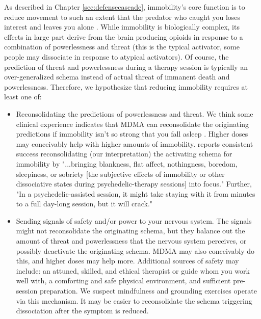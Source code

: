 \documentclass[12pt,letterpaper]{book}
\begin{document}
As described in Chapter \ref{sec:defensecascade}, immobility's core function is to reduce movement to such an extent that the predator who caught you loses interest and leaves you alone \cite{kozlowskaDefenseCascade}. While immobility is biologically complex, its effects in large part derive from the brain producing opioids in response to a combination of powerlessness and threat (this is the typical activator, some people may dissociate in response to atypical activators). Of course, the prediction of threat and powerlessness during a therapy session is typically an over-generalized schema instead of actual threat of immanent death and powerlessness. Therefore, we hypothesize that reducing immobility requires at least one of:
\begin{itemize}
	\item Reconsolidating the predictions of powerlessness and threat. We think some clinical experience indicates that MDMA can reconsolidate the originating predictions if immobility isn't so strong that you fall asleep \cite{razviPSIP}. Higher doses may conceivably help with higher amounts of immobility. \textcite{razviPSIP} reports consistent success reconsolidating (our interpretation) the activating schema for immobility by "...bringing blankness, flat affect, nothingness, boredom, sleepiness, or sobriety [the subjective effects of immobility or other dissociative states during psychedelic-therapy sessions] into focus." Further, "In a psychedelic-assisted session, it might take staying with it from minutes to a full day-long session, but it will crack." 
	\item Sending signals of safety and/or power to your nervous system. The signals might not reconsolidate the originating schema, but they balance out the amount of threat and powerlessness that the nervous system perceives, or possibly deactivate the originating schema. MDMA may also conceivably do this, and higher doses may help more. Additional sources of safety may include: an attuned, skilled, and ethical therapist or guide whom you work well with, a comforting and safe physical environment, and sufficient pre-session preparation. We suspect mindfulness and grounding exercises operate via this mechanism.  It may be easier to reconsolidate the schema triggering dissociation after the symptom is reduced.

\end{itemize}
\end{document}
